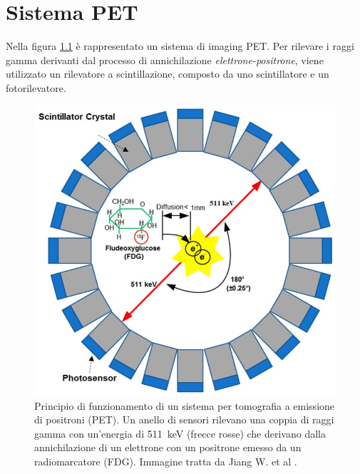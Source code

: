 \chapter{Sistema PET}
Nella figura \ref{fig:PET_imaging_system} è rappresentato un sistema di imaging PET. Per rilevare i raggi gamma derivanti dal processo di annichilazione \textit{elettrone-positrone}, viene utilizzato un rilevatore a scintillazione, composto da uno scintillatore e un fotorilevatore. 
\begin{figure}[h]
	\centering
	\includegraphics[width=0.45\linewidth]{./ImageFiles/PET_imaging_system}
	\caption{Principio di funzionamento di un sistema per tomografia a emissione di positroni (PET). Un anello di sensori rilevano una coppia di raggi gamma con un'energia di \SI{511}{\kilo\electronvolt} (frecce rosse) che derivano dalla annichilazione di un elettrone con un positrone emesso da un radiomarcatore (FDG). Immagine tratta da Jiang W. et al \cite{Jiang2019}.}
	\label{fig:PET_imaging_system}
\end{figure}

